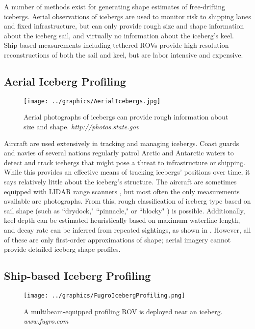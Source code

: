 A number of methods exist for generating shape estimates of free-drifting icebergs. Aerial observations of icebergs are used to monitor risk to shipping lanes and fixed infrastructure, but can only provide rough size and shape information about the iceberg sail, and virtually no information about the iceberg's keel. Ship-based measurements including tethered ROVs provide high-resolution reconstructions of both the sail and keel, but are labor intensive and expensive. 


\subsection{Aerial Iceberg Profiling}

\begin{figure}[!htb]
   \centering
   \texttt{[image: ../graphics/AerialIcebergs.jpg]} %
   \caption{ Aerial photographs of icebergs can provide rough information about size and shape. \emph{http://photos.state.gov}}
   \label{fig:IcebergAerial}
\end{figure}

Aircraft are used extensively in tracking and managing icebergs. Coast guards and navies of several nations regularly patrol Arctic and Antarctic waters to detect and track icebergs that might pose a threat to infrastructure or shipping. While this provides an effective means of tracking icebergs' positions over time, it says relatively little about the iceberg's structure. The aircraft are sometimes equipped with LIDAR range scanners \cite{Bunkin2012}, but most often the only measurements available are photographs. From this, rough classification of iceberg type based on sail shape (such as ``drydock," ``pinnacle," or ``blocky" ) is possible. Additionally, keel depth can be estimated heuristically based on maximum waterline length, and decay rate can be inferred from repeated sightings, as shown in \cite{Barker2004}. However, all of these are only first-order approximations of shape; aerial imagery cannot provide detailed iceberg shape profiles. 

\subsection{Ship-based Iceberg Profiling}

\begin{figure}[!htb]
   \centering
   \texttt{[image: ../graphics/FugroIcebergProfiling.png]} %
   \caption{ A multibeam-equipped profiling ROV is deployed near an iceberg. \emph{www.fugro.com}}
   \label{fig:IcebergROV}
\end{figure}

